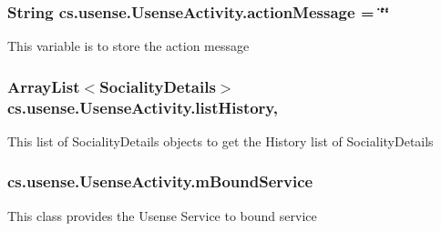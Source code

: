 \subsubsection[{action\+Message}]{\setlength{\rightskip}{0pt plus 5cm}String cs.\+usense.\+Usense\+Activity.\+action\+Message = \char`\"{}\char`\"{}\hspace{0.3cm}{\ttfamily [static]}}\label{classcs_1_1usense_1_1_usense_activity_ab6b1ca5ccc8b099baccc4bfd5bf7fed4}
This variable is to store the action message \hypertarget{classcs_1_1usense_1_1_usense_activity_a8597fab47ee590ad4420ad0a77aaaa24}{}
\subsubsection[{list\+History}]{\setlength{\rightskip}{0pt plus 5cm}Array\+List$<${\bf Sociality\+Details}$>$ cs.\+usense.\+Usense\+Activity.\+list\+History\hspace{0.3cm}{\ttfamily [static]}, {\ttfamily [private]}}\label{classcs_1_1usense_1_1_usense_activity_a8597fab47ee590ad4420ad0a77aaaa24}
This list of Sociality\+Details objects to get the History list of Sociality\+Details \hypertarget{classcs_1_1usense_1_1_usense_activity_a85e4dfec4eebe7691d68175af0a102d7}{}
\subsubsection[{m\+Bound\+Service}]{ cs.\+usense.\+Usense\+Activity.\+m\+Bound\+Service\hspace{0.3cm}{\ttfamily [private]}}\label{classcs_1_1usense_1_1_usense_activity_a85e4dfec4eebe7691d68175af0a102d7}
This class provides the Usense Service to bound service \hypertarget{classcs_1_1usense_1_1_usense_activity_ae27ad214010eea791ca67b2eff246e56}{}
